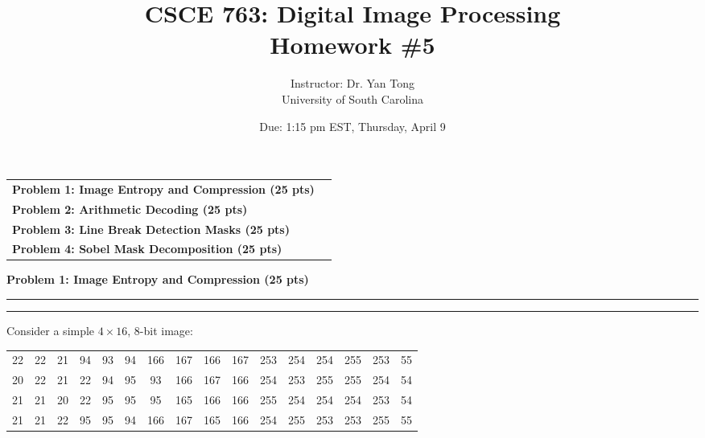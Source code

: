 \documentclass[12pt]{article}
\title{CSCE 763: Digital Image Processing \\ Homework \#5}
\author{Instructor: Dr. Yan Tong \\ University of South Carolina}
\date{Due: 1:15 pm EST, Thursday, April 9}
\newcommand{\question}[1]{%
  \clearpage
  \vspace{0.5cm}
  {\noindent\normalsize \textbf{#1}}
  \vspace{0.2cm}
  \hrule
  \vspace{0.1cm}
  \hrule
  \vspace{0.3cm}
}
\begin{document}
\maketitle
\setlength{\parindent}{0pt}



\begin{center}
\begin{tcolorbox}[colback=white, colframe=USC_Black90, colbacktitle=USC_Black10,
                  coltitle=USC_Black90, sharp corners, boxrule=1pt,
                  title=\Large\bfseries Table of Contents]
\begin{tabular}{p{}r}
\textbf{Problem 1: Image Entropy and Compression (25 pts)} \dotfill & \textbf{\pageref{quest:1}} \\[0.3em]
\textbf{Problem 2: Arithmetic Decoding (25 pts)} \dotfill & \textbf{\pageref{quest:2}} \\[0.3em]
\textbf{Problem 3: Line Break Detection Masks (25 pts)} \dotfill & \textbf{\pageref{quest:3}} \\[0.3em]
\textbf{Problem 4: Sobel Mask Decomposition (25 pts)} \dotfill & \textbf{\pageref{quest:4}} \\
\end{tabular}
\vspace{0.2cm}
\end{tcolorbox}
\end{center}

\vspace{0.5cm}


\question{Problem 1: Image Entropy and Compression (25 pts)}\label{quest:1}

Consider a simple $4 \times 16$, 8-bit image:

\vspace{0.3cm}

\begin{center}
\ttfamily
\begin{tabular}{cccccccccccccccc}
22 & 22 & 21 & 94 & 93 & 94 & 166 & 167 & 166 & 167 & 253 & 254 & 254 & 255 & 253 & 55 \\
20 & 22 & 21 & 22 & 94 & 95 & 93 & 166 & 167 & 166 & 254 & 253 & 255 & 255 & 254 & 54 \\
21 & 21 & 20 & 22 & 95 & 95 & 95 & 165 & 166 & 166 & 255 & 254 & 254 & 254 & 253 & 54 \\
21 & 21 & 22 & 95 & 95 & 94 & 166 & 167 & 165 & 166 & 254 & 255 & 253 & 253 & 255 & 55 \\
\end{tabular}
\end{center}
\end{document}
